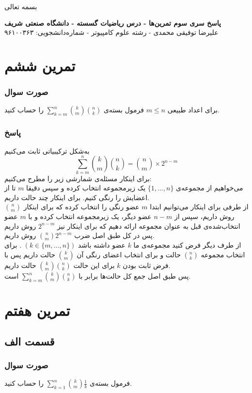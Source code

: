 \documentclass[12pt,a4paper]{article}
\begin{document}
\begin{center}
	بسمه تعالی
\end{center}
\begin{center}
	\textbf{
		پاسخ سری سوم تمرین‌ها
		- درس ریاضیات گسسته - دانشگاه صنعتی شریف}
	\\
	علیرضا توفیقی محمدی - رشته علوم کامپیوتر - شماره‌دانشجویی: ۹۶۱۰۰۳۶۳
\end{center}
\section{تمرین ششم}
\subsubsection{صورت سوال}
برای اعداد طبیعی 
$m \leq n$
فرمول بسته‌ی 
$\sum_{k=m}^n \binom{k}{m}\binom{n}{k}$
را حساب کنید.
\subsubsection{پاسخ}
به‌شکل ترکیبیاتی ثابت می‌کنیم 
\[
\sum_{k=m}^n \binom{k}{m}\binom{n}{k} = \binom{n}{m}\times 2^{n-m}
\]
برای اینکار مسئله‌ی شمارشی زیر را مطرح می‌کنیم:
\\
می‌خواهیم از مجموعه‌ی 
$\{1,..., n\}$
یک زیرمجموعه‌ انتخاب کرده و سپس دقیقا $m$ تا از اعضایش را رنگی کنیم. برای اینکار چند حالت داریم.
\\
از طرفی برای اینکار می‌توانیم ابتدا $m$ عضو رنگی را انتخاب کرده که برای اینکار 
$\binom{n}{m}$
روش داریم، سپس از $n-m$ عضو دیگر، یک زیرمجموعه انتخاب کرده و با $m$ عضو انتخاب‌شده‌ی قبل به عنوان مجموعه ارائه دهیم که برای اینکار نیز 
$2^{n-m}$
روش داریم پس در کل طبق اصل ضرب 
$\binom{n}{m} 2^{n-m}$
روش داریم.
\\
از طرف دیگر فرض کنید مجموعه‌ی ما $k$ عضو داشته باشد 
$(k \in \{m, ..., n\})$
.
برای انتخاب مجموعه 
$\binom{n}{k}$
حالت و برای انتخاب اعضای رنگی آن
$\binom{k}{m}$
حالت داریم پس با فرض ثابت بودن $k$ برای این حالت
$\binom{k}{m}\binom{n}{k}$
حالت داریم.
\\
پس طبق اصل جمع کل حالت‌ها برابر با 
$\sum_{k=m}^n \binom{k}{m}\binom{n}{k}$
است.

\section{تمرین هفتم}
\subsection{قسمت الف}
\subsubsection{صورت سوال}
فرمول بسته‌ی 
$\sum_{k=1}^n \binom{k}{m}\frac{1}{k}$
را حساب کنید.
\end{document}
